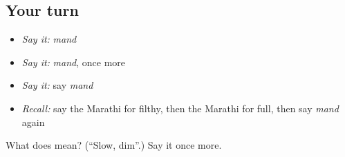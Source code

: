 \subsection*{Your turn}
\begin{itemize}
\raggedright
  \item \emph{Say it:} \emph{mand}
  \item \emph{Say it:} \emph{mand}, once more
  \item \emph{Say it:} say \emph{mand}
  \item \emph{Recall:} say the Marathi for filthy, then the Marathi for full, then say \emph{mand} again
\end{itemize}

\begin{tcolorbox}[breakable,colback=teal!4,colframe=teal!35!black,title={Before you move on}]
What does  mean? (\textquotedblleft{}Slow, dim\textquotedblright{}.) Say it once more.
\end{tcolorbox}
